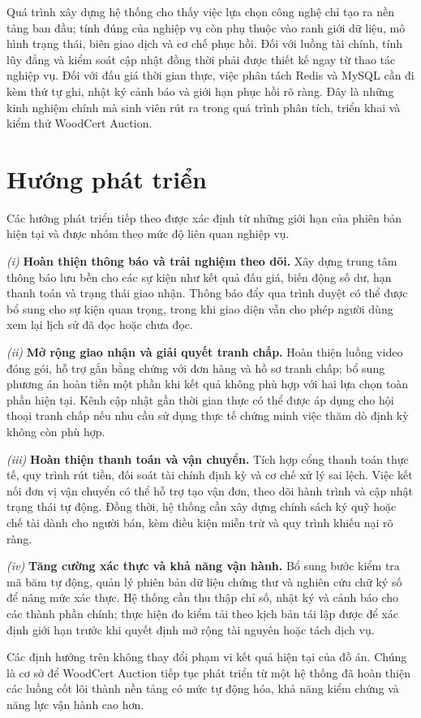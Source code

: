 \documentclass[../DoAn.tex]{subfiles}
\begin{document}
Quá trình xây dựng hệ thống cho thấy việc lựa chọn công nghệ chỉ tạo ra nền tảng ban đầu; tính đúng của nghiệp vụ còn phụ thuộc vào ranh giới dữ liệu, mô hình trạng thái, biên giao dịch và cơ chế phục hồi. Đối với luồng tài chính, tính lũy đẳng và kiểm soát cập nhật đồng thời phải được thiết kế ngay từ thao tác nghiệp vụ. Đối với đấu giá thời gian thực, việc phân tách Redis và MySQL cần đi kèm thứ tự ghi, nhật ký cảnh báo và giới hạn phục hồi rõ ràng. Đây là những kinh nghiệm chính mà sinh viên rút ra trong quá trình phân tích, triển khai và kiểm thử WoodCert Auction.

\section{Hướng phát triển}

Các hướng phát triển tiếp theo được xác định từ những giới hạn của phiên bản hiện tại và được nhóm theo mức độ liên quan nghiệp vụ.

\noindent\textit{(i)} \textbf{Hoàn thiện thông báo và trải nghiệm theo dõi.} Xây dựng trung tâm thông báo lưu bền cho các sự kiện như kết quả đấu giá, biến động số dư, hạn thanh toán và trạng thái giao nhận. Thông báo đẩy qua trình duyệt có thể được bổ sung cho sự kiện quan trọng, trong khi giao diện vẫn cho phép người dùng xem lại lịch sử đã đọc hoặc chưa đọc.

\noindent\textit{(ii)} \textbf{Mở rộng giao nhận và giải quyết tranh chấp.} Hoàn thiện luồng video đóng gói, hỗ trợ gắn bằng chứng với đơn hàng và hồ sơ tranh chấp; bổ sung phương án hoàn tiền một phần khi kết quả không phù hợp với hai lựa chọn toàn phần hiện tại. Kênh cập nhật gần thời gian thực có thể được áp dụng cho hội thoại tranh chấp nếu nhu cầu sử dụng thực tế chứng minh việc thăm dò định kỳ không còn phù hợp.

\noindent\textit{(iii)} \textbf{Hoàn thiện thanh toán và vận chuyển.} Tích hợp cổng thanh toán thực tế, quy trình rút tiền, đối soát tài chính định kỳ và cơ chế xử lý sai lệch. Việc kết nối đơn vị vận chuyển có thể hỗ trợ tạo vận đơn, theo dõi hành trình và cập nhật trạng thái tự động. Đồng thời, hệ thống cần xây dựng chính sách ký quỹ hoặc chế tài dành cho người bán, kèm điều kiện miễn trừ và quy trình khiếu nại rõ ràng.

\noindent\textit{(iv)} \textbf{Tăng cường xác thực và khả năng vận hành.} Bổ sung bước kiểm tra mã băm tự động, quản lý phiên bản dữ liệu chứng thư và nghiên cứu chữ ký số để nâng mức xác thực. Hệ thống cần thu thập chỉ số, nhật ký và cảnh báo cho các thành phần chính; thực hiện đo kiểm tải theo kịch bản tái lập được để xác định giới hạn trước khi quyết định mở rộng tài nguyên hoặc tách dịch vụ.

Các định hướng trên không thay đổi phạm vi kết quả hiện tại của đồ án. Chúng là cơ sở để WoodCert Auction tiếp tục phát triển từ một hệ thống đã hoàn thiện các luồng cốt lõi thành nền tảng có mức tự động hóa, khả năng kiểm chứng và năng lực vận hành cao hơn.
\end{document}
